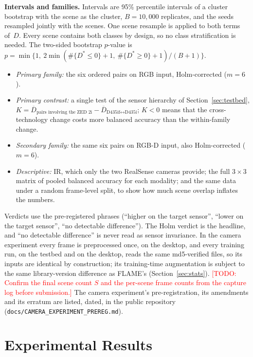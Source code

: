 \documentclass[journal]{IEEEtran}
\newcommand{\todo}[1]{\textcolor{red}{[TODO: #1]}}
\begin{document}
\textbf{Intervals and families.} Intervals are 95\% percentile intervals of a cluster bootstrap with the scene as the cluster, $B=10{,}000$ replicates, and the seeds resampled jointly with the scenes. One scene resample is applied to both terms of~$D$. Every scene contains both classes by design, so no class stratification is needed. The two-sided bootstrap $p$-value is $p = \min\{1,\ 2\min(\#\{D^{*} \le 0\}+1,\ \#\{D^{*} \ge 0\}+1)/(B+1)\}$.
\begin{itemize}
    \item \emph{Primary family:} the six ordered pairs on RGB input, Holm-corrected ($m=6$).
    \item \emph{Primary contrast:} a single test of the sensor hierarchy of Section~\ref{sec:testbed}, $K = \overline{D}_{\text{pairs involving the ZED~2i}} - \overline{D}_{\text{D435if}\leftrightarrow\text{D435i}}$; $K<0$ means that the cross-technology change costs more balanced accuracy than the within-family change.
    \item \emph{Secondary family:} the same six pairs on RGB-D input, also Holm-corrected ($m=6$).
    \item \emph{Descriptive:} IR, which only the two RealSense cameras provide; the full $3\times3$ matrix of pooled balanced accuracy for each modality; and the same data under a random frame-level split, to show how much scene overlap inflates the numbers.
\end{itemize}
Verdicts use the pre-registered phrases (``higher on the target sensor'', ``lower on the target sensor'', ``no detectable difference''). The Holm verdict is the headline, and ``no detectable difference'' is never read as sensor invariance. In the camera experiment every frame is preprocessed once, on the desktop, and every training run, on the testbed and on the desktop, reads the same md5-verified files, so its inputs are identical by construction; its training-time augmentation is subject to the same library-version difference as FLAME's (Section~\ref{sec:stats}). \todo{Confirm the final scene count $S$ and the per-scene frame counts from the capture log before submission.} The camera experiment's pre-registration, its amendments and its erratum are listed, dated, in the public repository (\texttt{docs/CAMERA\_EXPERIMENT\_PREREG.md}).


\section{Experimental Results}
\label{sec:results}
\end{document}
